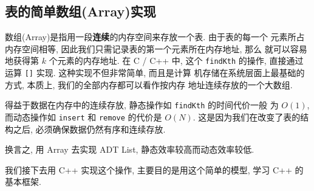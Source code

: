 \documentclass[a4paper]{ctexart}
\theoremstyle{definition}
\theoremstyle{definition}
\begin{document}


\subsection{表的简单数组(Array)实现}
数组(Array)是指用一段{\bf 连续}的内存空间来存放一个表. 由于表的每一个
元素所占内存空间相等, 因此我们只需记录表的第一个元素所在内存地址, 那么
就可以容易地获得第 $k$ 个元素的内存地址. 在 C / C++ 中, 这个 \verb|findKth|
的操作, 直接通过运算 \verb|[]| 实现. 这种实现不但非常简单, 而且是计算
机存储在系统层面上最基础的方式, 本质上, 我们的全部内存都可以看作按内存
地址连续存放的一个大数组.

得益于数据在内存中的连续存放, 静态操作如 \verb|findKth| 的时间代价一般
为 $O(1)$, 而动态操作如 \verb|insert| 和 \verb|remove| 的代价是
$O(N)$. 这是因为我们在改变了表的结构之后, 必须确保数据仍然有序和连续存放. 

换言之, 用 Array 去实现 ADT List, 静态效率较高而动态效率较低. 

我们接下去用 C++ 实现这个操作, 主要目的是用这个简单的模型, 学习 C++ 的
基本框架.


\end{document}
